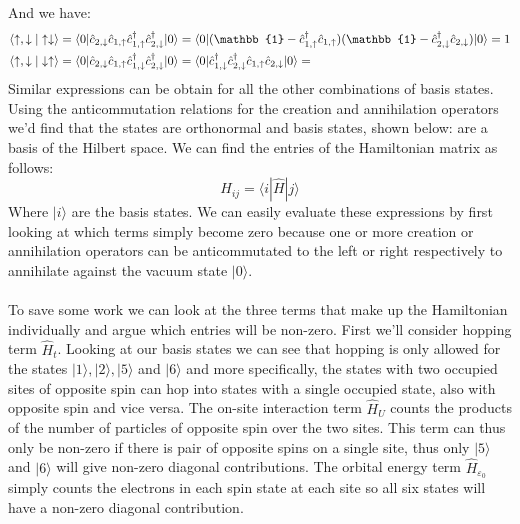\documentclass[12pt]{article}
\begin{document}
And we have:
\begin{align}
\langle \uparrow,\downarrow|\uparrow\downarrow\rangle&=\langle 0|\hat{c}_{2,\downarrow}\hat{c}_{1,\uparrow}\hat{c}_{1,\uparrow}^\dagger\hat{c}_{2,\downarrow}^\dagger|0\rangle=\langle 0|(\mathbb{1}-\hat{c}_{1,\uparrow}^\dagger\hat{c}_{1,\uparrow})(\mathbb{1}-\hat{c}_{2,\downarrow}^\dagger\hat{c}_{2,\downarrow})|0\rangle=1\\
\langle \uparrow,\downarrow|\downarrow\uparrow\rangle&=\langle 0|\hat{c}_{2,\downarrow}\hat{c}_{1,\uparrow}\hat{c}_{1,\downarrow}^\dagger\hat{c}_{2,\downarrow}^\dagger|0\rangle=\langle 0|\hat{c}_{1,\downarrow}^\dagger\hat{c}_{2,\downarrow}^\dagger\hat{c}_{1,\uparrow}\hat{c}_{2,\downarrow}|0\rangle=\notag
\end{align}
Similar expressions can be obtain for all the other combinations of basis states. Using the anticommutation relations for the creation and annihilation operators we'd find that the states are orthonormal and basis states, shown below: are a basis of the Hilbert space. We can find the entries of the Hamiltonian matrix as follows:
\begin{equation}
H_{ij}=\langle i|\hat{H}|j\rangle
\end{equation}
Where $|i\rangle$ are the basis states. We can easily evaluate these expressions by first looking at which terms simply become zero because one or more creation or annihilation operators can be anticommutated to the left or right respectively to annihilate against the vacuum state $|0\rangle$.\\
\\
To save some work we can look at the three terms that make up the Hamiltonian individually and argue which entries will be non-zero. First we'll consider hopping term $\hat{H}_t$. Looking at our basis states we can see that hopping is only allowed for the states $|1\rangle,|2\rangle,|5\rangle$ and $|6\rangle$ and more specifically, the states with two occupied sites of opposite spin can hop into states with a single occupied state, also with opposite spin and vice versa.
\newpage
\noindent
The on-site interaction term $\hat{H}_U$ counts the products of the number of particles of opposite spin over the two sites. This term can thus only be non-zero if there is pair of opposite spins on a single site, thus only $|5\rangle$ and $|6\rangle$ will give non-zero diagonal contributions. The orbital energy term $\hat{H}_{\varepsilon_0}$ simply counts the electrons in each spin state at each site so all six states will have a non-zero diagonal contribution.\\
\end{document}
